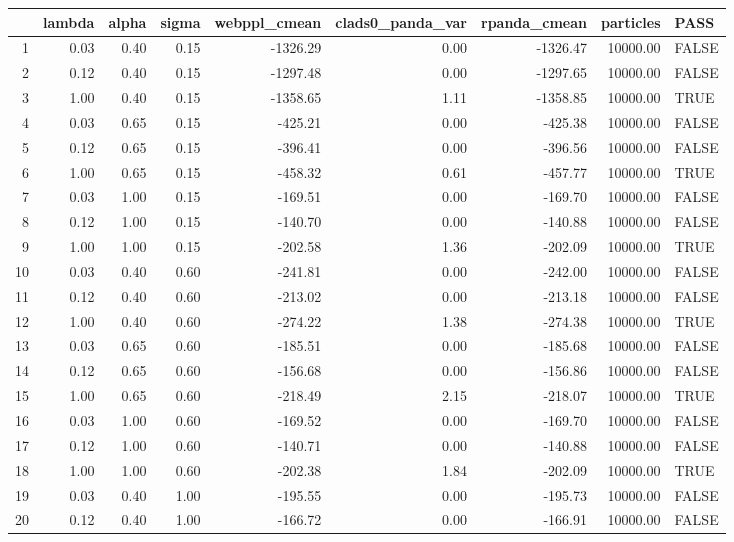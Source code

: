 \begin{table}[ht]
\centering
\begin{tabular}{rrrrrrrrl}
  \hline
 & lambda & alpha & sigma & webppl\_cmean & clads0\_panda\_var & rpanda\_cmean & particles & PASS \\ 
  \hline
1 & 0.03 & 0.40 & 0.15 & -1326.29 & 0.00 & -1326.47 & 10000.00 & FALSE \\ 
  2 & 0.12 & 0.40 & 0.15 & -1297.48 & 0.00 & -1297.65 & 10000.00 & FALSE \\ 
  3 & 1.00 & 0.40 & 0.15 & -1358.65 & 1.11 & -1358.85 & 10000.00 & TRUE \\ 
  4 & 0.03 & 0.65 & 0.15 & -425.21 & 0.00 & -425.38 & 10000.00 & FALSE \\ 
  5 & 0.12 & 0.65 & 0.15 & -396.41 & 0.00 & -396.56 & 10000.00 & FALSE \\ 
  6 & 1.00 & 0.65 & 0.15 & -458.32 & 0.61 & -457.77 & 10000.00 & TRUE \\ 
  7 & 0.03 & 1.00 & 0.15 & -169.51 & 0.00 & -169.70 & 10000.00 & FALSE \\ 
  8 & 0.12 & 1.00 & 0.15 & -140.70 & 0.00 & -140.88 & 10000.00 & FALSE \\ 
  9 & 1.00 & 1.00 & 0.15 & -202.58 & 1.36 & -202.09 & 10000.00 & TRUE \\ 
  10 & 0.03 & 0.40 & 0.60 & -241.81 & 0.00 & -242.00 & 10000.00 & FALSE \\ 
  11 & 0.12 & 0.40 & 0.60 & -213.02 & 0.00 & -213.18 & 10000.00 & FALSE \\ 
  12 & 1.00 & 0.40 & 0.60 & -274.22 & 1.38 & -274.38 & 10000.00 & TRUE \\ 
  13 & 0.03 & 0.65 & 0.60 & -185.51 & 0.00 & -185.68 & 10000.00 & FALSE \\ 
  14 & 0.12 & 0.65 & 0.60 & -156.68 & 0.00 & -156.86 & 10000.00 & FALSE \\ 
  15 & 1.00 & 0.65 & 0.60 & -218.49 & 2.15 & -218.07 & 10000.00 & TRUE \\ 
  16 & 0.03 & 1.00 & 0.60 & -169.52 & 0.00 & -169.70 & 10000.00 & FALSE \\ 
  17 & 0.12 & 1.00 & 0.60 & -140.71 & 0.00 & -140.88 & 10000.00 & FALSE \\ 
  18 & 1.00 & 1.00 & 0.60 & -202.38 & 1.84 & -202.09 & 10000.00 & TRUE \\ 
  19 & 0.03 & 0.40 & 1.00 & -195.55 & 0.00 & -195.73 & 10000.00 & FALSE \\ 
  20 & 0.12 & 0.40 & 1.00 & -166.72 & 0.00 & -166.91 & 10000.00 & FALSE \\ 

\end{tabular}
\end{table}
